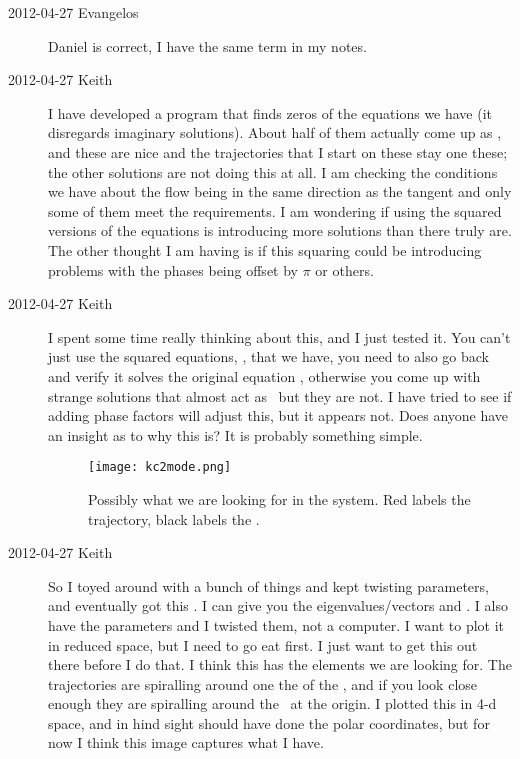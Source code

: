 \begin{description}
\item[2012-04-27 Evangelos] Daniel is correct, I have the same term in my notes.

\item[2012-04-27 Keith]  I have developed a program that finds zeros of
the equations we have (it disregards imaginary solutions).  About half of
them actually come up as \reqva, and these are nice and
the trajectories that I start on these stay one these; the other
solutions are not doing this at all.  I am checking the conditions we
have about the flow being in the same direction as the tangent and only
some of them meet the requirements.  I am wondering if using the squared
versions of the equations is introducing more solutions than there truly
are.  The other thought I am having is if this squaring could be
introducing problems with the phases being offset by $\pi$ or others.


\item[2012-04-27 Keith]  I spent some time really thinking about this,
and I just tested it.  You can't just use the squared equations,
, that we have, you need to also go back and verify
it solves the original equation , otherwise you
come up with strange solutions that almost act as \reqva\
but they are not.  I have tried to see if adding phase factors will
adjust this, but it appears not.  Does anyone have an insight as to why
this is?  It is probably something simple.

 \begin{figure}[h]
\centering
  \texttt{[image: kc2mode.png]}
\caption{
Possibly what we are looking for in the {\twoMode} system.  Red labels the
trajectory, black labels the \reqv.}
 \label{fig:2modeproblem}
\end{figure}

\item[2012-04-27 Keith] So I toyed around with a bunch of things and kept
twisting parameters, and eventually got this \reffig{fig:2modeproblem}.
I can give you the eigenvalues/vectors and \reqv.  I
also have the parameters and I twisted them, not a computer.  I want to
plot it in reduced space, but I need to go eat first.  I just want to get
this out there before I do that.  I think this has the elements we are
looking for.  The trajectories are spiralling around one the of the
\reqva, and if you look close enough they are spiralling
around the \eqv\ at the origin.  I plotted this in 4-d space, and
in hind sight should have done the polar coordinates, but for now I think
this image captures what I have.



\end{description}
